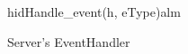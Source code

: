 \documentclass[Main]{subfiles}
\begin{document}
\begin{figure}[htbp]
\begin {sequencediagram}
\begin{messcall}{hid}{Handle\_event(h, eType)}{alm}

	\end{messcall}

\end{sequencediagram}

\caption{Server's EventHandler}
\label{fig:SererEventHandler}
\end{figure}
\end{document}
